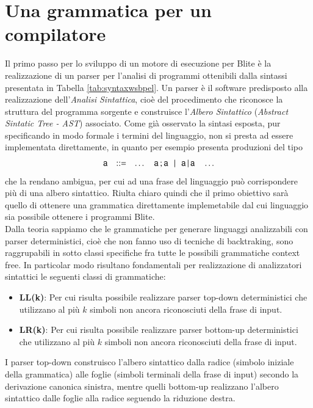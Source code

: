 \section{Una grammatica per un compilatore 
}

Il primo passo per lo sviluppo di un motore di esecuzione per Blite è la
realizzazione di un parser per l'analisi di programmi ottenibili dalla sintassi
presentata in Tabella \ref{tab:syntaxwsbpel}. Un parser è il software predisposto
alla realizzazione dell'\emph{Analisi Sintattica}, cioè del procedimento che
riconosce la struttura del programma sorgente e construisce l'\emph{Albero
Sintattico} (\emph{Abstract Sintatic Tree - AST}) associato. Come già osservato
la sintasi esposta, pur specificando in modo formale i termini del linguaggio,
non si presta ad essere implementata direttamente, in quanto per esempio
presenta produzioni del tipo 
$$
\begin{array}{rcl}
{\sf a} & ::= & \ldots \quad
{\sf a} \, ;{\sf a}  \!\!\quad | \quad\!\! {\sf a} \,|\, {\sf a} \quad \ldots 
\end{array}
$$
che la rendano ambigua, per cui ad una frase del linguaggio può corrispondere
più di una albero sintattico. Riulta chiaro quindi che il primo obiettivo sarà
quello di ottenere una grammatica direttamente implemetabile 
dal cui linguaggio sia possibile ottenere i programmi Blite.
\\

Dalla teoria sappiamo che le grammatiche per generare linguaggi
analizzabili con parser deterministici, cioè che non fanno uso di tecniche di
backtraking, sono raggrupabili in sotto classi specifiche fra tutte le possibili
grammatiche context free. In particolar modo risultano fondamentali per
realizzazione di analizzatori sintattici le seguenti classi di grammatiche:
\begin{itemize}
  \item \textbf{LL(k)}: Per cui risulta possibile realizzare parser top-down
  deterministici che utilizzano al più $k$ simboli non ancora riconosciuti
  della frase di input.
  \item \textbf{LR(k)}: Per cui risulta possibile realizzare parser bottom-up
  deterministici che utilizzano al più $k$ simboli non ancora riconosciuti
  della frase di input.
\end{itemize}

I parser top-down construisco l'albero sintattico dalla radice (simbolo
iniziale della grammatica) alle foglie (simboli terminali della frase di
input) secondo la derivazione canonica sinistra, mentre quelli bottom-up
realizzano l'albero sintattico dalle foglie alla radice seguendo la riduzione
destra. 

